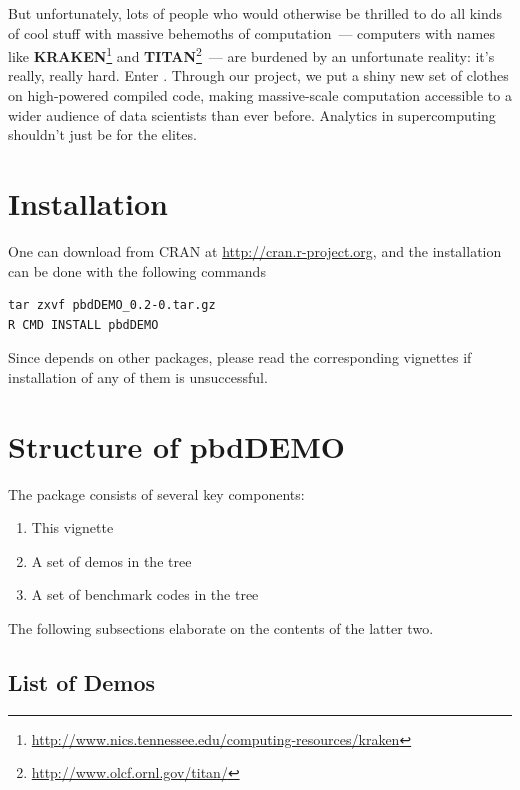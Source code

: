But unfortunately, lots of people who would otherwise be thrilled to do all
kinds of cool stuff with massive behemoths of computation~--- computers with
names like \textbf{KRAKEN}\footnote{
\url{http://www.nics.tennessee.edu/computing-resources/kraken}
} and \textbf{TITAN}\footnote{
\url{http://www.olcf.ornl.gov/titan/}
}~--- are burdened by an
unfortunate reality:  it's really, really hard.
Enter \pbdR. Through our project, we put a shiny new set of
clothes on high-powered compiled code, making massive-scale computation
accessible to a wider audience of data scientists than ever before.
Analytics in supercomputing shouldn't just be for the elites.



\section[Installation]{Installation}
\label{sec:installation}

One can download  from CRAN at
\url{http://cran.r-project.org}, and
the installation can be done with the following commands
\begin{lstlisting}
tar zxvf pbdDEMO_0.2-0.tar.gz
R CMD INSTALL pbdDEMO
\end{lstlisting}
Since  depends on other \pbdR packages, please read
the corresponding vignettes if installation of any of them is unsuccessful.





\section{Structure of pbdDEMO}

The  package consists of several key components:

\begin{enumerate}
  \item This vignette
  \item A set of demos in the  tree
  \item A set of benchmark codes in the  tree
\end{enumerate}

The following subsections elaborate on the contents of the latter two.


\subsection{List of Demos}
\label{sec:demolist}

